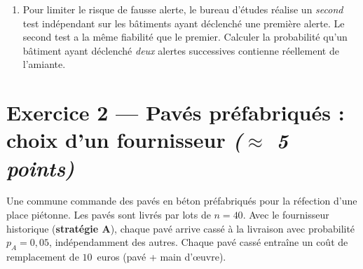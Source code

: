 \begin{enumerate}
  \item Pour limiter le risque de fausse alerte, le bureau d'études réalise un \emph{second} test indépendant sur les bâtiments ayant déclenché une première alerte. Le second test a la même fiabilité que le premier. Calculer la probabilité qu'un bâtiment ayant déclenché \emph{deux} alertes successives contienne réellement de l'amiante.

\end{enumerate}

\bigskip

\section*{Exercice 2 --- Pavés préfabriqués : choix d'un fournisseur \hfill {\normalfont \itshape ($\approx$ 5 points)}}

Une commune commande des pavés en béton préfabriqués pour la réfection d'une place piétonne. Les pavés sont livrés par lots de $n = 40$. Avec le fournisseur historique (\textbf{stratégie A}), chaque pavé arrive cassé à la livraison avec probabilité $p_A = 0{,}05$, indépendamment des autres. Chaque pavé cassé entraîne un coût de remplacement de $10$~euros (pavé + main d'\oe uvre).

